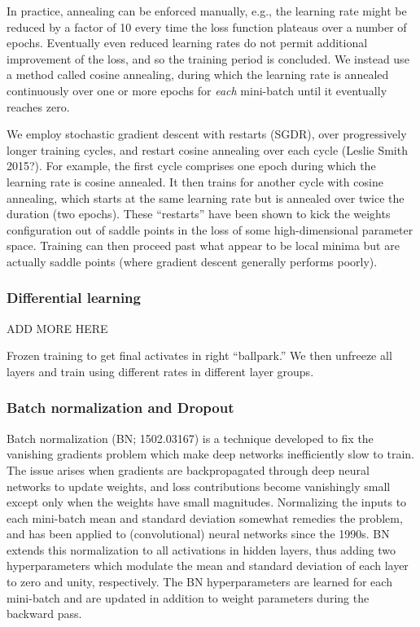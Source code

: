 \documentclass[fleqn,usenatbib]{mnras}
\begin{document}
In practice, annealing can be enforced manually, e.g., the learning rate might be reduced by a factor of 10 every time the loss function plateaus over a number of epochs.
Eventually even reduced learning rates do not permit additional improvement of the loss, and so the training period is concluded.
We instead use a method called cosine annealing, during which the learning rate is annealed continuously over one or more epochs for \textit{each} mini-batch until it eventually reaches zero.


We employ stochastic gradient descent with restarts (SGDR), over progressively longer training cycles, and restart cosine annealing over each cycle (Leslie Smith 2015?).
For example, the first cycle comprises one epoch during which the learning rate is cosine annealed.
It then trains for another cycle with cosine annealing, which starts at the same learning rate but is annealed over twice the duration (two epochs).
These ``restarts'' have been shown to kick the weights configuration out of saddle points in the loss of some high-dimensional parameter space.
Training can then proceed past what appear to be local minima but are actually saddle points (where gradient descent generally performs poorly).


\subsubsection{Differential learning}
ADD MORE HERE

Frozen training to get final activates in right ``ballpark.''
We then unfreeze all layers and train using different rates in different layer groups.

\subsubsection{Batch normalization and Dropout}

Batch normalization (BN; 1502.03167) is a technique developed to fix the vanishing gradients problem which make deep networks inefficiently slow to train.
The issue arises when gradients are backpropagated through deep neural networks to update weights, and loss contributions become vanishingly small except only when the weights have small magnitudes.
Normalizing the inputs to each mini-batch mean and standard deviation somewhat remedies the problem, and has been applied to (convolutional) neural networks since the 1990s.
BN extends this normalization to all activations in hidden layers, thus adding two hyperparameters which modulate the mean and standard deviation of each layer to zero and unity, respectively.
The BN hyperparameters are learned for each mini-batch and are updated in addition to weight parameters during the backward pass.
\end{document}
